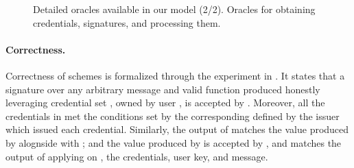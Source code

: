 {\begin{figure*}[htp!]
{\begin{minipage}[t]{.5\textwidth}
        \procedure{$\SIGN(\oid,\uid,\scid,\msg,\feval)$}{%
          \pcif \uid \notin \HU: \pcreturn \bot \\
          (\sig,\yeval) \gets \Sign(\PRVUK[\uid],\PUBOK[\oid],\CRED[\scid],\msg,
          \feval) \\
          \SIG[\uid] \gets \SIG[\uid] \cup
          \lbrace (\oid,\scid,\sig,\yeval,\msg,\feval) \rbrace \\
          \pcreturn (\sig,\yeval) \\
        }                

        
      \end{minipage}
      
    }

    \caption{Detailed oracles available in our model (2/2). Oracles for
      obtaining credentials, signatures, and processing them.}
    \label{fig:oracles2}
  \end{figure*}
}

\paragraph{Correctness.} %
Correctness of \UAS schemes is formalized through the experiment in
. It states that a signature over any arbitrary message
and valid function \feval produced honestly leveraging credential set \scid,
owned by user \uid, is accepted by \Verify. Moreover, all the credentials in
\scid met the conditions set by the corresponding \fissue defined by the issuer
which issued each credential. Similarly, the output \yeval of \feval matches the
value produced by \Sign alognside with \sig; and the value produced by \Inspect
is accepted by \Judge, and matches the output of applying \finsp on \yeval, the
credentials, user key, and message.

